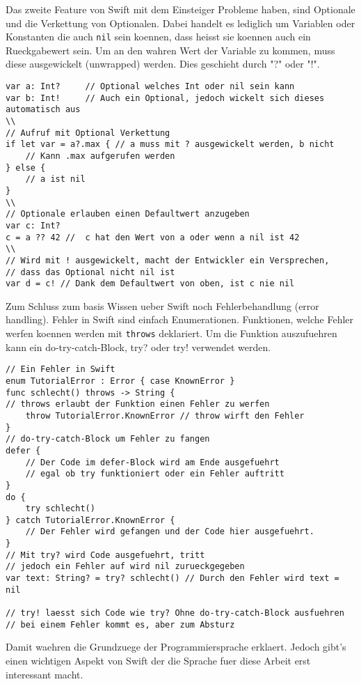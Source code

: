 Das zweite Feature von Swift mit dem Einsteiger Probleme haben, sind Optionale und die Verkettung von Optionalen. Dabei handelt es lediglich um Variablen oder Konstanten die auch \lstinline{nil} sein koennen, dass heisst sie koennen auch ein Rueckgabewert sein. Um an den wahren Wert der Variable zu kommen, muss diese ausgewickelt (unwrapped) werden. Dies geschieht durch "?" oder "!". 
\begin{lstlisting}
var a: Int? 	// Optional welches Int oder nil sein kann
var b: Int! 	// Auch ein Optional, jedoch wickelt sich dieses automatisch aus
\\
// Aufruf mit Optional Verkettung
if let var = a?.max { // a muss mit ? ausgewickelt werden, b nicht
	// Kann .max aufgerufen werden
} else {
	// a ist nil
}
\\
// Optionale erlauben einen Defaultwert anzugeben
var c: Int?
c = a ?? 42 //  c hat den Wert von a oder wenn a nil ist 42
\\
// Wird mit ! ausgewickelt, macht der Entwickler ein Versprechen,
// dass das Optional nicht nil ist
var d = c! // Dank dem Defaultwert von oben, ist c nie nil
\end{lstlisting}
Zum Schluss zum basis Wissen ueber Swift noch Fehlerbehandlung (error handling). Fehler in Swift sind einfach Enumerationen. Funktionen, welche Fehler werfen koennen werden mit \lstinline{throws} deklariert. Um die Funktion auszufuehren kann ein do-try-catch-Block, try? oder try! verwendet werden.
\begin{lstlisting}
// Ein Fehler in Swift
enum TutorialError : Error { case KnownError }
func schlecht() throws -> String { 
// throws erlaubt der Funktion einen Fehler zu werfen
    throw TutorialError.KnownError // throw wirft den Fehler
}
// do-try-catch-Block um Fehler zu fangen
defer {
    // Der Code im defer-Block wird am Ende ausgefuehrt
    // egal ob try funktioniert oder ein Fehler auftritt
}
do {
    try schlecht()
} catch TutorialError.KnownError {
    // Der Fehler wird gefangen und der Code hier ausgefuehrt.
}
// Mit try? wird Code ausgefuehrt, tritt
// jedoch ein Fehler auf wird nil zurueckgegeben
var text: String? = try? schlecht() // Durch den Fehler wird text = nil

// try! laesst sich Code wie try? Ohne do-try-catch-Block ausfuehren
// bei einem Fehler kommt es, aber zum Absturz 
\end{lstlisting}
Damit waehren die Grundzuege der Programmiersprache erklaert. Jedoch gibt’s einen wichtigen Aspekt von Swift der die Sprache fuer diese Arbeit erst interessant  macht.
